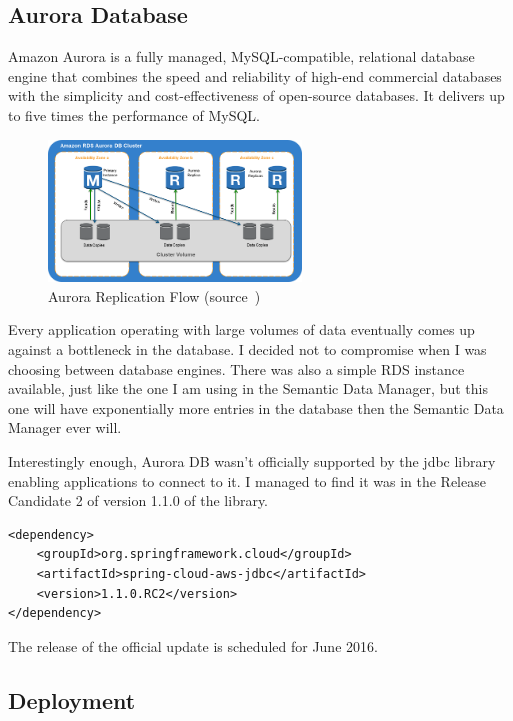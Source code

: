 \subsection{Aurora Database}

Amazon Aurora is a fully managed, MySQL-compatible, relational database engine that combines the speed and reliability of high-end commercial databases with the simplicity and cost-effectiveness of open-source databases. It delivers up to five times the performance of MySQL.

\begin{figure}[!ht]
	\centering
	\includegraphics[width=0.6\textwidth]{figures/04_implementation/aurora}
    \caption[Aurora Replication Flow]{Aurora Replication Flow (source~\protect\cite{aurora})}
\end{figure}

\newpage

Every application operating with large volumes of data eventually comes up against a bottleneck in the database. I decided not to compromise when I was choosing between database engines. There was also a simple RDS instance available, just like the one I am using in the Semantic Data Manager, but this one will have exponentially more entries in the database then the Semantic Data Manager ever will.

Interestingly enough, Aurora DB wasn't officially supported by the jdbc library enabling applications to connect to it. I managed to find it was in the Release Candidate 2 of version 1.1.0 of the library. 

\bigbreak

\begin{lstlisting}
<dependency>
	<groupId>org.springframework.cloud</groupId>
	<artifactId>spring-cloud-aws-jdbc</artifactId>
	<version>1.1.0.RC2</version>
</dependency>
\end{lstlisting}

\bigbreak

The release of the official update is scheduled for June 2016.

\subsection{Deployment}

